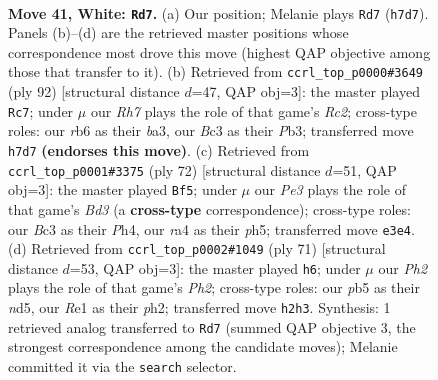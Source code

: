 \documentclass[11pt]{article}
\begin{document}
\clearpage

\begin{figure}[p]\centering
\begin{subfigure}{0.46\textwidth}\centering
\resizebox{\linewidth}{!}{%
\newchessgame
\chessboard[
  setfen={5k2/7R/1r1n4/1p4p1/r7/2B1P1P1/b4PKP/4R3 w - - 0 41},
  showmover=false,
  pgfstyle=straightmove, color=movearrow, markmove={h7-d7}
]}
\caption{}
\end{subfigure}\hfill
\begin{subfigure}{0.46\textwidth}\centering
\resizebox{\linewidth}{!}{%
\newchessgame
\chessboard[
  setfen={5k2/6p1/B7/5p1p/1p1r4/bP4P1/P1R2PK1/8 w - - 0 47},
  showmover=false,
  pgfstyle=straightmove, color=movearrow, markmove={c2-c7}
]}
\caption{}
\end{subfigure}
\\[4pt]
\begin{subfigure}{0.46\textwidth}\centering
\resizebox{\linewidth}{!}{%
\newchessgame
\chessboard[
  setfen={1r5r/4kp2/2R5/3p3p/7P/3B1PP1/4PK2/8 w - - 3 37},
  showmover=false,
  pgfstyle=straightmove, color=movearrow, markmove={d3-f5}
]}
\caption{}
\end{subfigure}\hfill
\begin{subfigure}{0.46\textwidth}\centering
\resizebox{\linewidth}{!}{%
\newchessgame
\chessboard[
  setfen={8/5pkp/6p1/3N2P1/8/K7/1P1R3P/1br5 b - - 0 36},
  showmover=false,
  pgfstyle=straightmove, color=movearrow, markmove={h7-h6}
]}
\caption{}
\end{subfigure}
\caption{\textbf{Move 41, White: \texttt{Rd7}.} (a) Our position; Melanie plays \texttt{Rd7} (\texttt{h7d7}). Panels (b)--(d) are the retrieved master positions whose correspondence most drove this move (highest QAP objective among those that transfer to it). (b) Retrieved from \texttt{ccrl\_top\_p0000\#3649} (ply 92) [structural distance $d$=47, QAP obj=3]: the master played \texttt{Rc7}; under $\mu$ our \emph{Rh7} plays the role of that game's \emph{Rc2}; cross-type roles: our \emph{r}b6 as their \emph{b}a3, our \emph{B}c3 as their \emph{P}b3; transferred move \texttt{h7d7} \textbf{(endorses this move)}. (c) Retrieved from \texttt{ccrl\_top\_p0001\#3375} (ply 72) [structural distance $d$=51, QAP obj=3]: the master played \texttt{Bf5}; under $\mu$ our \emph{Pe3} plays the role of that game's \emph{Bd3} (a \textbf{cross-type} correspondence); cross-type roles: our \emph{B}c3 as their \emph{P}h4, our \emph{r}a4 as their \emph{p}h5; transferred move \texttt{e3e4}. (d) Retrieved from \texttt{ccrl\_top\_p0002\#1049} (ply 71) [structural distance $d$=53, QAP obj=3]: the master played \texttt{h6}; under $\mu$ our \emph{Ph2} plays the role of that game's \emph{Ph2}; cross-type roles: our \emph{p}b5 as their \emph{n}d5, our \emph{R}e1 as their \emph{p}h2; transferred move \texttt{h2h3}. Synthesis: 1 retrieved analog transferred to \texttt{Rd7} (summed QAP objective 3, the strongest correspondence among the candidate moves); Melanie committed it via the \texttt{search} selector.}
\label{fig:thought-m80}
\end{figure}
\end{document}
